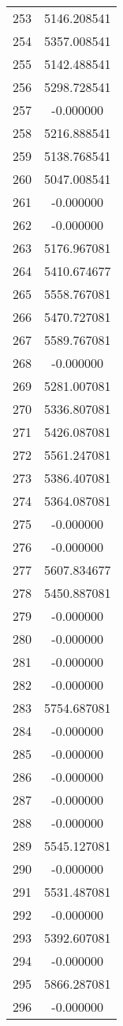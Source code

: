 \documentclass[12pt]{article}
\begin{document}
\begin{longtable}{@{}cc@{}}
253 & 5146.208541 \\
254 & 5357.008541 \\
255 & 5142.488541 \\
256 & 5298.728541 \\
257 & -0.000000 \\
258 & 5216.888541 \\
259 & 5138.768541 \\
260 & 5047.008541 \\
261 & -0.000000 \\
262 & -0.000000 \\
263 & 5176.967081 \\
264 & 5410.674677 \\
265 & 5558.767081 \\
266 & 5470.727081 \\
267 & 5589.767081 \\
268 & -0.000000 \\
269 & 5281.007081 \\
270 & 5336.807081 \\
271 & 5426.087081 \\
272 & 5561.247081 \\
273 & 5386.407081 \\
274 & 5364.087081 \\
275 & -0.000000 \\
276 & -0.000000 \\
277 & 5607.834677 \\
278 & 5450.887081 \\
279 & -0.000000 \\
280 & -0.000000 \\
281 & -0.000000 \\
282 & -0.000000 \\
283 & 5754.687081 \\
284 & -0.000000 \\
285 & -0.000000 \\
286 & -0.000000 \\
287 & -0.000000 \\
288 & -0.000000 \\
289 & 5545.127081 \\
290 & -0.000000 \\
291 & 5531.487081 \\
292 & -0.000000 \\
293 & 5392.607081 \\
294 & -0.000000 \\
295 & 5866.287081 \\
296 & -0.000000 \\

\end{longtable}
\end{document}
